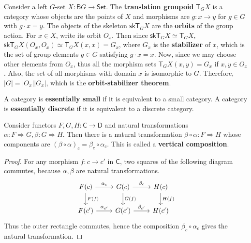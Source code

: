 \begin{exmp} Consider a left $G$-set $X:\mathsf{B}G\rightarrow \mathsf{Set}$. The \textbf{translation groupoid} $\mathsf{T}_G X$ is a category whose objects are the points of $X$ and morphisms are $g:x\rightarrow y$ for $g\in G$ with $g\cdot x=y$. The objects of the skeleton $\mathsf{skT}_G X$ are the \textbf{orbits} of the group action. For $x\in X$, write its orbit $O_x$. Then since $\mathsf{skT}_G X\simeq \mathsf{T}_G X$, $\mathsf{skT}_G X(O_x,O_x)\simeq \mathsf{T}_G X(x,x)=G_x$, where $G_x$ is the \textbf{stabilizer} of $x$, which is the set of group elements $g\in G$ satisfying $g\cdot x=x$. Now, since we may choose other elements from $O_x$, thus all the morphism sets $\mathsf{T}_G X(x,y)=G_x$ if $x,y\in O_x$. Also, the set of all morphisms with domain $x$ is isomorphic to $G$. Therefore, $|G|=|O_x||G_x|$, which is the \textbf{orbit-stabilizer theorem}.
\end{exmp}

\begin{defn} A category is \textbf{essentially small} if it is equivalent to a small category. A category is \textbf{essentially discrete} if it is equivalent to a discrete category.
\end{defn}

\begin{lemma} Consider functors $F,G,H:\mathsf{C}\rightarrow \mathsf{D}$ and natural transformations $\alpha:F\Rightarrow G,\beta:G\Rightarrow H$. Then there is a natural transformation $\beta\circ \alpha:F\Rightarrow H$ whose components are $(\beta\circ \alpha)_c=\beta_c\circ \alpha_c$. This is called a \textbf{vertical composition}.
\end{lemma}
\begin{proof} For any morphism $f:c\rightarrow c'$ in $\mathsf{C}$, two squares of the following diagram commutes, because $\alpha,\beta$ are natural transformations.
\begin{equation}
\begin{tikzcd}
F(c)\arrow{r}{\alpha_c} \arrow{d}{F(f)}& G(c)\arrow{r}{\beta_c} \arrow{d}{G(f)} & H(c)\arrow{d}{H(f)}\\
F(c')\arrow{r}{\alpha_{c'}} & G(c')\arrow{r}{\beta_{c'}} & H(c')
\end{tikzcd}
\end{equation}
Thus the outer rectangle commutes, hence the composition $\beta_c\circ \alpha_c$ gives the natural transformation.
\end{proof}

